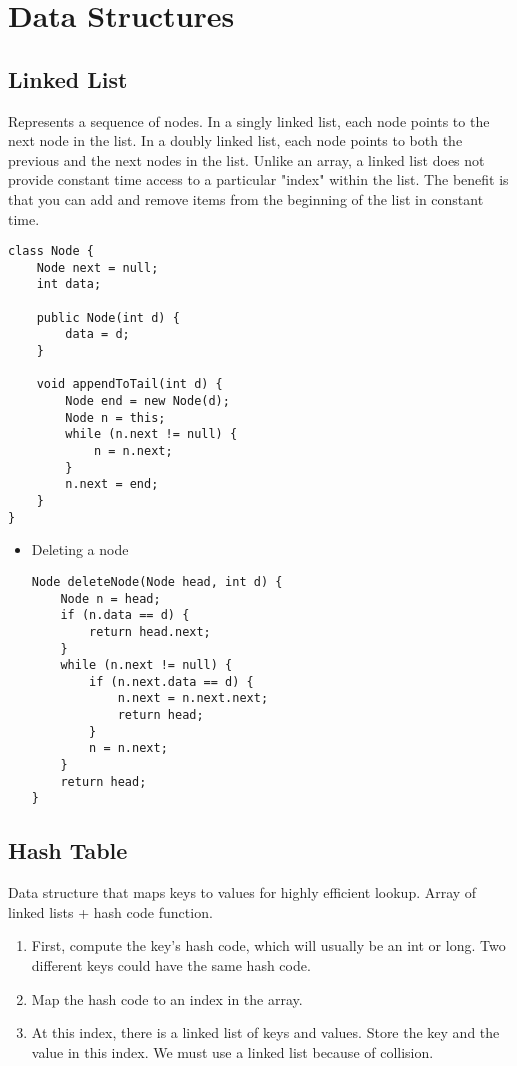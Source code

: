 \documentclass[a4paper, 11.25pt]{article}
\begin{document}
\clearpage
\section{Data Structures}
\subsection{Linked List}
Represents a sequence of nodes. In a singly linked list, each node points to the next node in the list. In a doubly linked list, each node points to both the previous and the next nodes in the list.
Unlike an array, a linked list does not provide constant time access to a particular "index" within the list. The benefit is that you can add and remove items from the beginning of the list in constant time.
\begin{lstlisting}[style=CStyle]
class Node {
    Node next = null;
    int data;
    
    public Node(int d) {
        data = d;
    }
    
    void appendToTail(int d) {
        Node end = new Node(d);
        Node n = this;
        while (n.next != null) {
            n = n.next;
        }
        n.next = end;
    }
}\end{lstlisting}

\begin{itemize}
    \item Deleting a node
    \begin{lstlisting}[style=CStyle]
Node deleteNode(Node head, int d) {
    Node n = head;
    if (n.data == d) {
        return head.next;
    }
    while (n.next != null) {
        if (n.next.data == d) {
            n.next = n.next.next;
            return head;
        }
        n = n.next;
    }
    return head;
}\end{lstlisting}
\end{itemize}

\subsection{Hash Table}
Data structure that maps keys to values for highly efficient lookup. Array of linked lists + hash code function.
\begin{enumerate}
    \item First, compute the key's hash code, which will usually be an int or long. Two different keys could have the same hash code.
    \item Map the hash code to an index in the array.
    \item At this index, there is a linked list of keys and values. Store the key and the value in this index. We must use a linked list because of collision. 
\end{enumerate}
\end{document}
